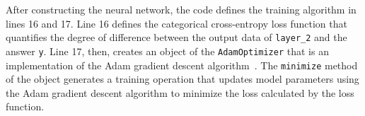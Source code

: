 
After constructing the neural network, the code defines the training algorithm
in lines 16 and 17.
Line 16 defines the categorical cross-entropy loss function that
quantifies the degree of difference between the output data of {\tt layer\_2}
and the answer {\tt y}.
Line 17, then, creates an object of the {\tt AdamOptimizer} that is an
implementation of the Adam gradient descent algorithm~\cite{kingma2014adam}.
The {\tt minimize} method of the object generates a training operation that
updates model parameters using the Adam gradient descent algorithm to minimize
the loss calculated by the loss function.


